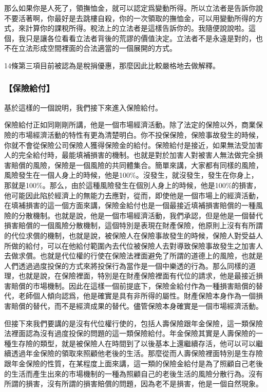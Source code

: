 \documentclass[oneside,sub3section]{ctexbook}
\begin{document}
那么如果你是人死了，領撫恤金，就可以認定爲變動所得。所以立法者是告訴你說不要活著啊，你最好是去跳樓自殺，你的一次領取的撫恤金，可以用變動所得的方式，來計算你的課稅所得。稅法上的立法者是這樣告訴你的。我隨便說說啦。這個，我只是讓各位看看立法者背後的荒謬的價值決定。立法者不是永遠是對的，也不在立法形成空間裡面的合法適當的一個展開的方式。

14條第三項目前被認為是稅捐優惠，那麼因此比較嚴格地去做解釋。

\hypertarget{ux4fddux96aaux7d66ux4ed8}{%
\subsubsection{【保險給付】}\label{ux4fddux96aaux7d66ux4ed8}}

基於這樣的一個說明，我們接下來進入保險給付。

保險給付正如同剛剛所講，他是一個市場經濟活動。除了法定的保險以外，商業保險的市場經濟活動的特性有更為清楚明白。你不投保保險，保險事故發生的時候，你就不會從保險公司保險人獲得保險金的給付。保險給付是接近，如果無法受加害人的完全給付時，最能填補損害的機制。也就是對於加害人對被害人無法做完全損害賠償的風險，保險是一個風險的共同體集合。簡單來講，大家都有同樣的風險，風險發生在一個人身上的時候，他是100\%。沒發生，就沒發生，發生在你身上，那就是100\%。那么，由於這種風險發生在個別人身上的時候，他是100\%的損害，他可能因此陷於經濟上的無能力去應對，從而，即使他是一個市場上的經濟活動，在填補損害的這一個方面來講，保險金給付也是一個最接近填補損害賠償的一種風險的分散機制。也就是說，他是一個市場經濟活動，我們承認，但是他是一個替代損害賠償的一個風險分散機制，這個特別是表現在財產保險，他原則上沒有有所謂的代位求償的機制，也就是說，被保險人在保險事故發生的時候，保險人對受益人所做的給付，可以在他給付範圍內去代位被保險人去對導致保險事故發生之加害人去做求償。也就是代位權的行使在保險法裡面避免了所謂的道德上的風險，也就是人們透過過度投保的方式來將投保行為當作是一個中樂透的行為。那么同樣的道理，也就是說，在保險裡面，特別是在財產保險裡面有代位的請求，他是最接近損害賠償的市場機制。因此在這樣一個前提底下，保險金給付作為一種損害賠償的替代，老師個人傾向認爲，他是確實是具有非所得的屬性。財產保險本身作為一個損害賠償的替代，而不是經濟成果的替代。儘管保險本身確實是一個市場經濟活動。

但接下來我們要講的是沒有代位權行使的，包括人壽保險跟年金保險，這一類保險法裡面認為沒有過度投保的問題的這一類保險給付。年金保險其實是人壽保險的一種生存險的類型，就是被保險人在時間到了以後基本上還繼續存活，他可以可以繼續透過年金保險的領取來照顧他老後的生活。那麼從而人壽保險裡面特別是生存險跟年金保險的性質，在某程度上面來講，這一類的保險金給付是為了照顧自己老後的生活而產生出來的市場機制的一種為照顧自己的老後生活的風險分散行為。沒有所謂的損害，沒有所謂的損害賠償的問題，因為老不是損害，他是一個自然現象。
\end{document}
